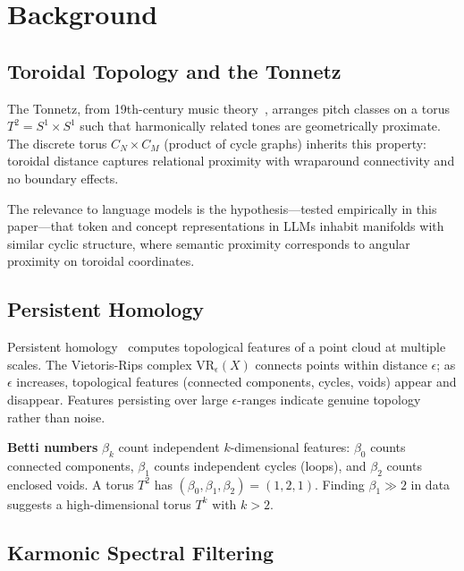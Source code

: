 \documentclass[11pt,a4paper]{article}
\begin{document}
\section{Background}

\subsection{Toroidal Topology and the Tonnetz}

The Tonnetz, from 19th-century music theory~\cite{euler1739tonnetz}, arranges pitch classes on a torus $T^2 = S^1 \times S^1$ such that harmonically related tones are geometrically proximate. The discrete torus $C_N \times C_M$ (product of cycle graphs) inherits this property: toroidal distance captures relational proximity with wraparound connectivity and no boundary effects.

The relevance to language models is the hypothesis---tested empirically in this paper---that token and concept representations in LLMs inhabit manifolds with similar cyclic structure, where semantic proximity corresponds to angular proximity on toroidal coordinates.

\subsection{Persistent Homology}

Persistent homology~\cite{carlsson2009topology,bauer2021ripser} computes topological features of a point cloud at multiple scales. The Vietoris-Rips complex $\text{VR}_\epsilon(X)$ connects points within distance $\epsilon$; as $\epsilon$ increases, topological features (connected components, cycles, voids) appear and disappear. Features persisting over large $\epsilon$-ranges indicate genuine topology rather than noise.

\textbf{Betti numbers} $\beta_k$ count independent $k$-dimensional features: $\beta_0$ counts connected components, $\beta_1$ counts independent cycles (loops), and $\beta_2$ counts enclosed voids. A torus $T^2$ has $(\beta_0, \beta_1, \beta_2) = (1, 2, 1)$. Finding $\beta_1 \gg 2$ in data suggests a high-dimensional torus $T^k$ with $k > 2$.

\subsection{Karmonic Spectral Filtering}
\end{document}
